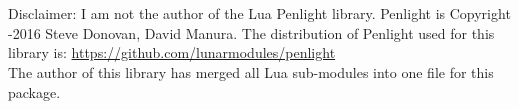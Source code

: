 \documentclass[11pt,parskip=half]{scrartcl}
\begin{document}
    \section*{}
    Disclaimer: I am not the author of the Lua Penlight library.
    Penlight is Copyright -2016 Steve Donovan, David Manura.
    The distribution of Penlight used for this library is:
\url{https://github.com/lunarmodules/penlight}\\
    The author of this library has merged all Lua sub-modules into one file for this package.
\end{document}
